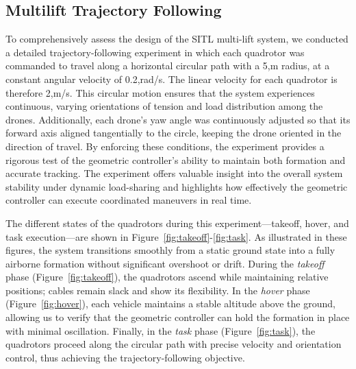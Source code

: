 \documentclass[12pt,twoside,letterpaper]{article}
\begin{document}
\subsection{Multilift Trajectory Following}
To comprehensively assess the design of the SITL multi-lift system, we conducted a detailed trajectory-following experiment in which each quadrotor was commanded to travel along a horizontal circular path with a 5,m radius, at a constant angular velocity of 0.2,rad/s. The linear velocity for each quadrotor is therefore 2,m/s. This circular motion ensures that the system experiences continuous, varying orientations of tension and load distribution among the drones. Additionally, each drone’s yaw angle was continuously adjusted so that its forward axis aligned tangentially to the circle, keeping the drone oriented in the direction of travel. By enforcing these conditions, the experiment provides a rigorous test of the geometric controller’s ability to maintain both formation and accurate tracking. The experiment offers valuable insight into the overall system stability under dynamic load-sharing and highlights how effectively the geometric controller can execute coordinated maneuvers in real time.

The different states of the quadrotors during this experiment—takeoff, hover, and task execution—are shown in Figure~\ref{fig:takeoff}-\ref{fig:task}. As illustrated in these figures, the system transitions smoothly from a static ground state into a fully airborne formation without significant overshoot or drift. During the \emph{takeoff} phase (Figure~\ref{fig:takeoff}), the quadrotors ascend while maintaining relative positions; cables remain slack and show its flexibility.  In the \emph{hover} phase (Figure~\ref{fig:hover}), each vehicle maintains a stable altitude above the ground, allowing us to verify that the geometric controller can hold the formation in place with minimal oscillation. Finally, in the \emph{task} phase (Figure~\ref{fig:task}), the quadrotors proceed along the circular path with precise velocity and orientation control, thus achieving the trajectory-following objective.
\end{document}
